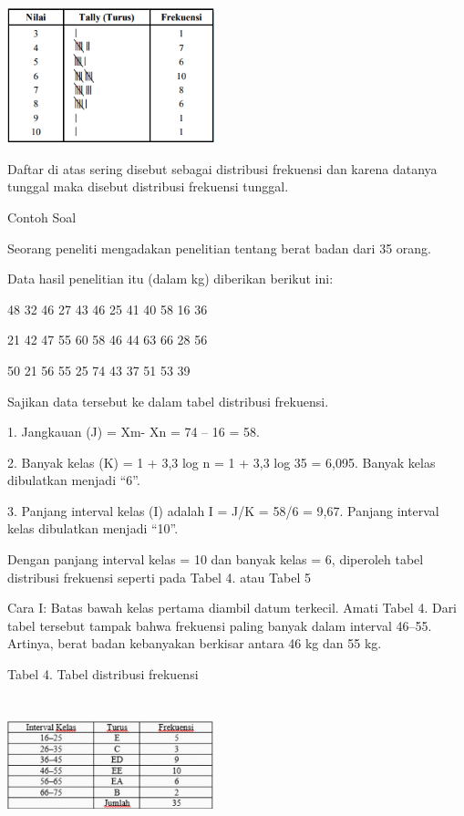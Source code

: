 \documentclass[11pt,fleqn]{book} %
\begin{document}
{\includegraphics[width = 6cm, height= 4cm]{Pictures/1reska.png}

Daftar di atas sering disebut sebagai distribusi frekuensi dan karena datanya
tunggal maka disebut distribusi frekuensi tunggal.

Contoh Soal 

Seorang peneliti mengadakan penelitian tentang berat badan dari 35 orang.

Data hasil penelitian itu (dalam kg) diberikan berikut ini:

48 32 46 27 43 46 25 41 40 58 16 36

21 42 47 55 60 58 46 44 63 66 28 56

50 21 56 55 25 74 43 37 51 53 39


Sajikan data tersebut ke dalam tabel distribusi frekuensi.

1. Jangkauan (J) = Xm- Xn = 74 – 16 = 58.


2. Banyak kelas (K) = 1 + 3,3 log n = 1 + 3,3 log 35 = 6,095. Banyak kelas dibulatkan menjadi “6”.


3. Panjang interval kelas (I) adalah I = J/K = 58/6 = 9,67. Panjang interval kelas dibulatkan menjadi “10”.


Dengan panjang interval kelas = 10 dan banyak kelas = 6, diperoleh tabel distribusi frekuensi seperti pada Tabel 4. atau Tabel 5


Cara I: Batas bawah kelas pertama diambil datum terkecil. Amati Tabel 4. Dari tabel tersebut tampak bahwa frekuensi paling banyak dalam interval 46–55. Artinya, berat badan kebanyakan berkisar antara 46 kg dan 55 kg.

Tabel 4. Tabel distribusi frekuensi

\includegraphics[width = 6cm, height= 4cm]{Pictures/17reska.png}


}
\end{document}
